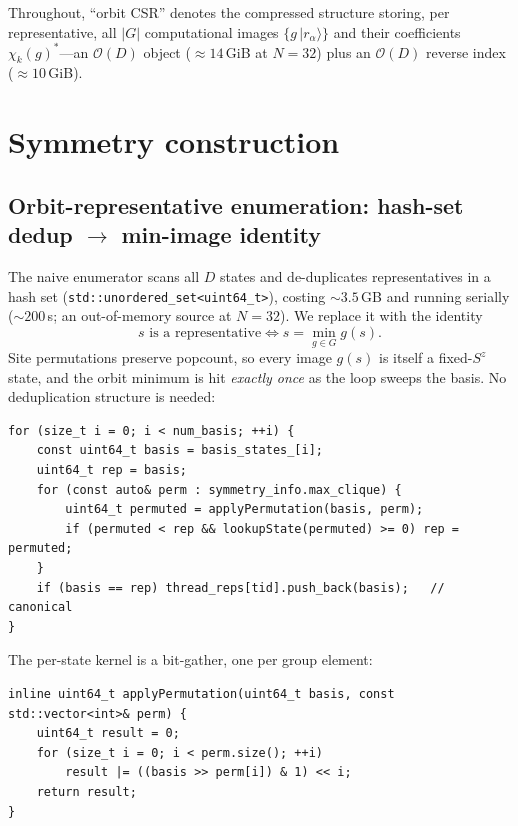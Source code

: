 \documentclass[11pt]{article}
\newcommand{\bigO}{\mathcal{O}}
\newcommand{\code}[1]{\texttt{\small #1}}
\begin{document}
Throughout, ``orbit CSR'' denotes the compressed structure storing, per
representative, all $|G|$ computational images $\{g\,|r_\alpha\rangle\}$ and
their coefficients $\chi_k(g)^{*}$---an $\bigO(D)$ object (${\approx}14$\,GiB at
$N{=}32$) plus an $\bigO(D)$ reverse index (${\approx}10$\,GiB).

\section{Symmetry construction}

\subsection{Orbit-representative enumeration: hash-set dedup $\rightarrow$
            min-image identity}

The naive enumerator scans all $D$ states and de-duplicates representatives in a
hash set (\code{std::unordered\_set<uint64\_t>}), costing ${\sim}3.5$\,GB and
running serially (${\sim}200$\,s; an out-of-memory source at $N{=}32$). We
replace it with the identity
\begin{equation}
  s \text{ is a representative} \iff s = \min_{g\in G} g(s).
  \label{eq:repid}
\end{equation}
Site permutations preserve popcount, so every image $g(s)$ is itself a
fixed-$S^z$ state, and the orbit minimum is hit \emph{exactly once} as the loop
sweeps the basis. No deduplication structure is needed:

\begin{lstlisting}[caption={Canonical-representative pass (per-thread, no dedup
set). \code{include/ed/core/streaming\_symmetry.h}},label={lst:pass1}]
for (size_t i = 0; i < num_basis; ++i) {
    const uint64_t basis = basis_states_[i];
    uint64_t rep = basis;
    for (const auto& perm : symmetry_info.max_clique) {
        uint64_t permuted = applyPermutation(basis, perm);
        if (permuted < rep && lookupState(permuted) >= 0) rep = permuted;
    }
    if (basis == rep) thread_reps[tid].push_back(basis);   // canonical
}
\end{lstlisting}

The per-state kernel is a bit-gather, one per group element:
\begin{lstlisting}[caption={\code{applyPermutation} --- output bit $i$ is sourced
from input bit \code{perm[i]}. \code{include/ed/core/basis\_utils.h}}]
inline uint64_t applyPermutation(uint64_t basis, const std::vector<int>& perm) {
    uint64_t result = 0;
    for (size_t i = 0; i < perm.size(); ++i)
        result |= ((basis >> perm[i]) & 1) << i;
    return result;
}
\end{lstlisting}
\end{document}
